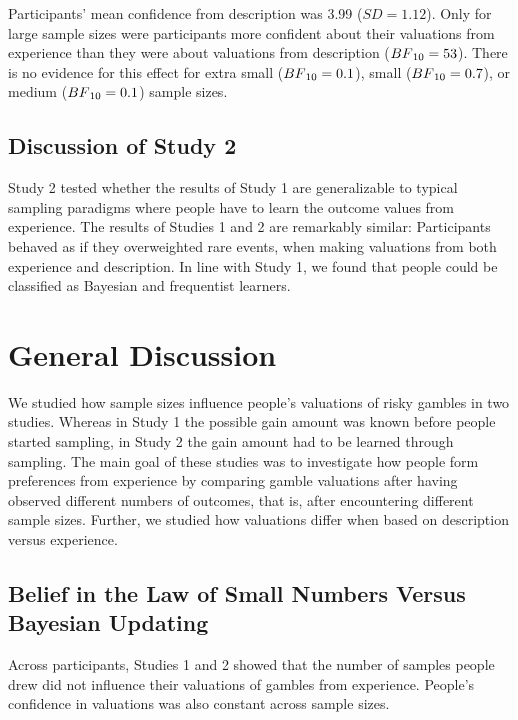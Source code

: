 \documentclass[a4paper,man, natbib]{apa6} %
\begin{document}
Participants' mean confidence from description was 3.99 ($SD = 1.12$). Only for large sample sizes were participants more confident about their valuations from experience than they were about valuations from description ($BF\textsubscript{10} = 53$). There is no evidence for this effect for extra small ($BF\textsubscript{10} = 0.1$), small ($BF\textsubscript{10} = 0.7$), or medium ($BF\textsubscript{10} = 0.1$) sample sizes.
\subsection{Discussion of Study 2}
Study 2 tested whether the results of Study 1 are generalizable to typical sampling paradigms where people have to learn the outcome values from experience. The results of Studies 1 and 2 are remarkably similar: Participants behaved as if they overweighted rare events, when making valuations from both experience and description. In line with Study 1, we found that people could be classified as Bayesian and frequentist learners.

\section{General Discussion}
We studied how sample sizes influence people's valuations of risky gambles in two studies. Whereas in Study 1 the possible gain amount was known before people started sampling, in Study 2 the gain amount had to be learned through sampling. The main goal of these studies was to investigate how people form preferences from experience by comparing gamble valuations after having observed different numbers of outcomes, that is, after encountering different sample sizes. Further, we studied how valuations differ when based on description versus experience. 


\subsection{Belief in the Law of Small Numbers Versus Bayesian Updating}
Across participants, Studies 1 and 2 showed that the number of samples people drew did not influence their valuations of gambles from experience. People's confidence in valuations was also constant across sample sizes. 
\end{document}
